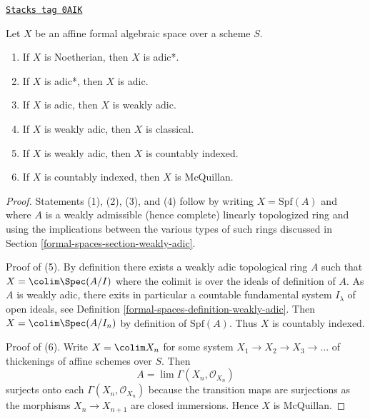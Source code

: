 \begin{lemma}
\label{formal-spaces-lemma-implications-between-types}
\href{https://stacks.math.columbia.edu/tag/0AIK}{\texttt{Stacks tag 0AIK}}

Let $X$ be an affine formal algebraic space over a scheme $S$.
\begin{enumerate}
\item If $X$ is Noetherian, then $X$ is adic*.
\item If $X$ is adic*, then $X$ is adic.
\item If $X$ is adic, then $X$ is weakly adic.
\item If $X$ is weakly adic, then $X$ is classical.
\item If $X$ is weakly adic, then $X$ is countably indexed.
\item If $X$ is countably indexed, then $X$ is McQuillan.
\end{enumerate}
\end{lemma}

\begin{proof}
Statements (1), (2), (3), and (4) follow by writing $X = \text{Spf}(A)$
and where $A$ is a weakly admissible (hence complete) linearly
topologized ring and using the implications between the various
types of such rings discussed in Section \ref{formal-spaces-section-weakly-adic}.

\medskip\noindent
Proof of (5). By definition there exists a weakly adic topological ring $A$
such that $X = \colim \Spec(A/I)$ where the colimit is over the ideals
of definition of $A$. As $A$ is weakly adic, there exits in particular
a countable fundamental system $I_\lambda$ of open ideals, see
Definition \ref{formal-spaces-definition-weakly-adic}.
Then $X = \colim \Spec(A/I_n)$ by definition of $\text{Spf}(A)$.
Thus $X$ is countably indexed.

\medskip\noindent
Proof of (6). Write $X = \colim X_n$ for some system
$X_1 \to X_2 \to X_3 \to \ldots$ of thickenings of affine
schemes over $S$. Then
$$
A = \lim \Gamma(X_n, \mathcal{O}_{X_n})
$$
surjects onto each $\Gamma(X_n, \mathcal{O}_{X_n})$ because the transition
maps are surjections as the morphisms $X_n \to X_{n + 1}$ are closed
immersions. Hence $X$ is McQuillan.
\end{proof}

